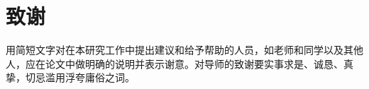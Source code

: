
\chapter*{致谢}

用简短文字对在本研究工作中提出建议和给予帮助的人员，如老师和同学以及其他人，应在论文中做明确的说明并表示谢意。对导师的致谢要实事求是、诚恳、真挚，切忌滥用浮夸庸俗之词。
